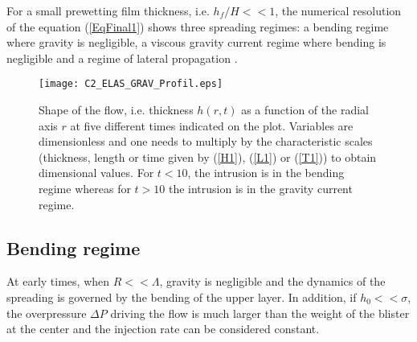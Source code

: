 For  a  small  prewetting   film  thickness,  i.e.   $h_f/H<<1$,  the
numerical  resolution of  the  equation  (\ref{EqFinal1}) shows  three
spreading regimes:  a bending  regime where  gravity is  negligible, a
viscous  gravity current  regime  where bending  is  negligible and  a
regime               of              lateral               propagation
\citep{Michaut:2011kg,Bunger:2011cb,Lister:2013ia}.

\begin{figure}[h!]
  \begin{center}
    \graphicspath{ {/Users/thorey/Documents/These/Manuscript/Figure/Chapter2/} }
    \texttt{[image: C2\_ELAS\_GRAV\_Profil.eps]}
    \caption{Shape of the flow, i.e.  thickness $h(r,t)$ as a function
      of the radial axis $r$ at  five different times indicated on the
      plot. Variables are  dimensionless and one needs  to multiply by
      the characteristic  scales (thickness,  length or time  given by
      (\ref{H1}),  (\ref{L1})  or  (\ref{T1})) to  obtain  dimensional
      values.   For $t<10$,  the intrusion  is in  the bending  regime
      whereas  for $t>10$  the  intrusion is  in  the gravity  current
      regime.}
    \label{C2_ELAS_GRAV_Profil}
  \end{center}
\end{figure}

\subsection{Bending regime}
\label{C2-sec:bending-regime}

At  early times,  when  $R<<\Lambda$, gravity  is  negligible and  the
dynamics of  the spreading  is governed  by the  bending of  the upper
layer.   In addition,  if $h_0<<\sigma$,  the overpressure  $\Delta P$
driving the flow is much larger than  the weight of the blister at the
center and the injection rate can be considered constant.


